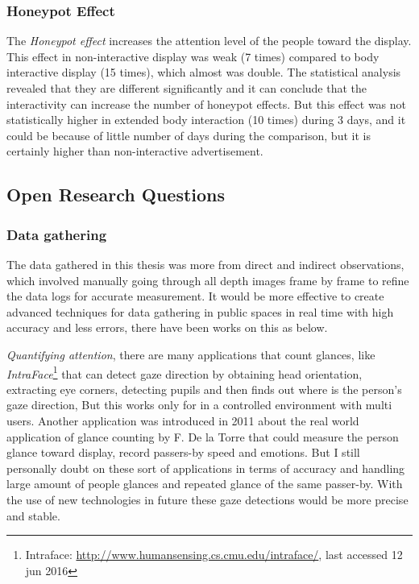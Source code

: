 \subsubsection{Honeypot Effect}
The \emph{Honeypot effect} increases the attention level of the people toward the display. This effect in non-interactive display was weak (7 times) compared to body interactive display (15 times), which almost was double. The statistical analysis revealed that they are different significantly and it can conclude that the interactivity can increase the number of honeypot effects. But this effect was not statistically higher in extended body interaction (10 times) during 3 days, and it could be because of little number of days during the comparison, but it is certainly higher than non-interactive advertisement.



\subsection{Open Research Questions}


\subsubsection{Data gathering}

The data gathered in this thesis was more from direct and indirect observations, which involved manually going through all depth images frame by frame to refine the data logs for accurate measurement. It would be more effective to create advanced techniques for data gathering in public spaces in real time with high accuracy and less errors, there have been works on this as below.

\emph{Quantifying attention}, there are many applications that count glances, like \emph{IntraFace}\footnote{Intraface: \url{ http://www.humansensing.cs.cmu.edu/intraface/}, last accessed 12 jun 2016}\cite{Intraface} that can detect gaze direction by obtaining head orientation, extracting eye corners, detecting pupils and then finds out where is the person’s gaze direction, But this works only for in a controlled environment with multi users.  Another application was introduced in 2011 about the real world application of glance counting by F. De la Torre \cite{glancingcount} that could measure the person glance toward display, record passers-by speed and emotions. But I still personally doubt on these sort of applications in terms of accuracy and handling large amount of people glances and repeated glance of the same passer-by. With the use of new technologies in future these gaze detections would be more precise and stable.

